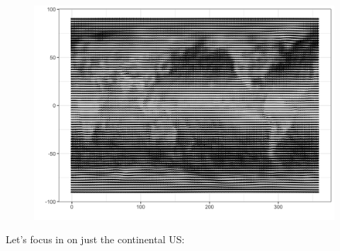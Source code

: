 \documentclass[]{book}
\theoremstyle{definition}
\theoremstyle{definition}
\theoremstyle{remark}
\begin{document}
\begin{figure}[htbp]
\centering
\includegraphics{fig/spoke-glyphs-1.png}
\caption{}
\end{figure}

Let's focus in on just the continental US:
\end{document}
